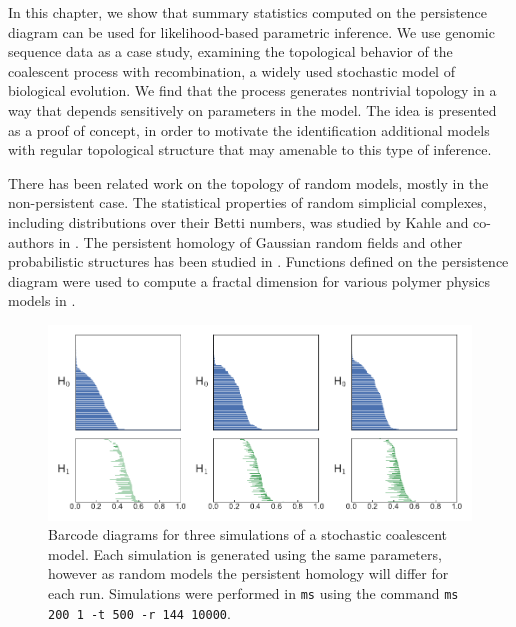 In this chapter, we show that summary statistics computed on the persistence diagram can be used for likelihood-based parametric inference.
We use genomic sequence data as a case study, examining the topological behavior of the coalescent process with recombination, a widely used stochastic model of biological evolution.
We find that the process generates nontrivial topology in a way that depends sensitively on parameters in the model.
The idea is presented as a proof of concept, in order to motivate the identification additional models with regular topological structure that may amenable to this type of inference.

There has been related work on the topology of random models, mostly in the non-persistent case.
The statistical properties of random simplicial complexes, including distributions over their Betti numbers, was studied by Kahle and co-authors in \cite{Kahle:2011ep,Kahle:2013vy}.
The persistent homology of Gaussian random fields and other probabilistic structures has been studied in \cite{Adler:2010}.
Functions defined on the persistence diagram were used to compute a fractal dimension for various polymer physics models in \cite{MacPherson:2012eq}.

\begin{figure}
\centering
\includegraphics[width=\textwidth]{fig/parametric_inference/sim_barcodes.pdf}
\caption[Barcode Diagrams for Three Coalescent Simulations]{Barcode diagrams for three simulations of a stochastic coalescent model. Each simulation is generated using the same parameters, however as random models the persistent homology will differ for each run. Simulations were performed in \texttt{ms} using the command \texttt{ms 200 1 -t 500 -r 144 10000}.}
\label{fig:sim_barcodes}
\end{figure}


